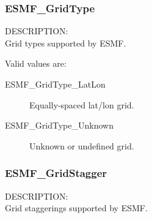 
\subsubsection{ESMF\_GridType}

{\sf DESCRIPTION:\\}
Grid types supported by ESMF.

Valid values are:
\begin{description}
   \item[ESMF\_GridType\_LatLon] 
        Equally-spaced lat/lon grid.
   \item[ESMF\_GridType\_Unknown] 
        Unknown or undefined grid.

\end{description}

\subsubsection{ESMF\_GridStagger}

{\sf DESCRIPTION:\\}
Grid staggerings supported by ESMF.

